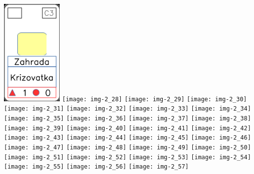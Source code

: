 \documentclass[a4paper]{article}
\begin{document}
	\includegraphics[width=3.0cm]{img-2_27}
	\texttt{[image: img-2\_28]}
	\texttt{[image: img-2\_29]}
	\texttt{[image: img-2\_30]}
	\texttt{[image: img-2\_31]}
	\texttt{[image: img-2\_32]}
	\texttt{[image: img-2\_33]}
	\texttt{[image: img-2\_34]}
	\texttt{[image: img-2\_35]}
	\texttt{[image: img-2\_36]}
	\texttt{[image: img-2\_37]}
	\texttt{[image: img-2\_38]}
	\texttt{[image: img-2\_39]}
	\texttt{[image: img-2\_40]}
	\texttt{[image: img-2\_41]}
	\texttt{[image: img-2\_42]}
	\texttt{[image: img-2\_43]}
	\texttt{[image: img-2\_44]}
	\texttt{[image: img-2\_45]}
	\texttt{[image: img-2\_46]}
	\texttt{[image: img-2\_47]}
	\texttt{[image: img-2\_48]}
	\texttt{[image: img-2\_49]}
	\texttt{[image: img-2\_50]}
	\texttt{[image: img-2\_51]}
	\texttt{[image: img-2\_52]}
	\texttt{[image: img-2\_53]}
	\texttt{[image: img-2\_54]}
	\texttt{[image: img-2\_55]}
	\texttt{[image: img-2\_56]}
	\texttt{[image: img-2\_57]}
\end{document}
